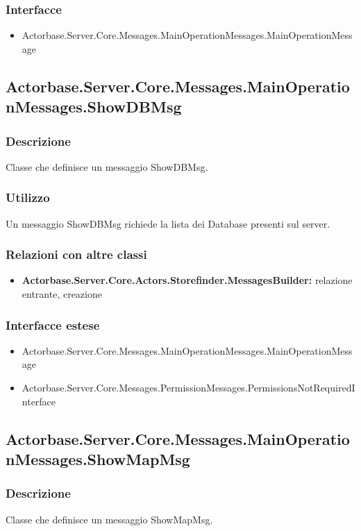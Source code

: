 \documentclass[a4paper]{article}
\begin{document}
			\subsubsection{Interfacce}
			\begin{itemize}
				\item Actorbase.Server.Core.Messages.MainOperationMessages.MainOperationMessage
			\end{itemize}

			\subsection{Actorbase.Server.Core.Messages.MainOperationMessages.ShowDBMsg}
			\subsubsection{Descrizione}
				Classe che definisce un messaggio ShowDBMsg.
			\subsubsection{Utilizzo}
				Un messaggio ShowDBMsg richiede la lista dei Database presenti sul server.
			\subsubsection{Relazioni con altre classi}
			\begin{itemize}
				\item \textbf{Actorbase.Server.Core.Actors.Storefinder.MessagesBuilder:} relazione entrante, creazione
			\end{itemize}
			\subsubsection{Interfacce estese}
			\begin{itemize}
				\item Actorbase.Server.Core.Messages.MainOperationMessages.MainOperationMessage
				\item Actorbase.Server.Core.Messages.PermissionMessages.PermissionsNotRequiredInterface
			\end{itemize}

			\subsection{Actorbase.Server.Core.Messages.MainOperationMessages.ShowMapMsg}
			\subsubsection{Descrizione}
				Classe che definisce un messaggio ShowMapMsg.
\end{document}
